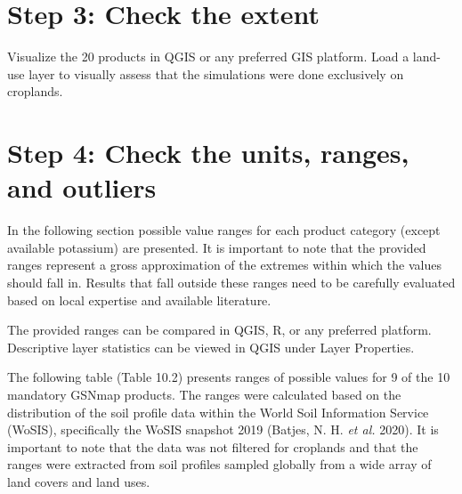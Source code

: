 \documentclass[
  10pt,
  b5paper,
  oneside]{book}
\begin{document}
\hypertarget{step-3-check-the-extent}{%
\section*{Step 3: Check the extent}\label{step-3-check-the-extent}}

Visualize the 20 products in QGIS or any preferred GIS platform. Load a land-use layer to visually assess that the simulations were done exclusively on croplands.

\hypertarget{step-4-check-the-units-ranges-and-outliers}{%
\section*{Step 4: Check the units, ranges, and outliers}\label{step-4-check-the-units-ranges-and-outliers}}

In the following section possible value ranges for each product category (except available potassium) are presented. It is important to note that the provided ranges represent a gross approximation of the extremes within which the values should fall in. Results that fall outside these ranges need to be carefully evaluated based on local expertise and available literature.

The provided ranges can be compared in QGIS, R, or any preferred platform. Descriptive layer statistics can be viewed in QGIS under Layer Properties.

The following table (Table 10.2) presents ranges of possible values for 9 of the 10 mandatory GSNmap products. The ranges were calculated based on the distribution of the soil profile data within the World Soil Information Service (WoSIS), specifically the WoSIS snapshot 2019 (Batjes, N. H. \emph{et al.} 2020). It is important to note that the data was not filtered for croplands and that the ranges were extracted from soil profiles sampled globally from a wide array of land covers and land uses.
\end{document}
